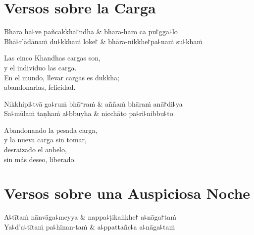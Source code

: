\chapter{Versos sobre la Carga}


\begin{leader}
\end{leader}

\begin{twochants}
Bhārā ha꜕ve pañcakkha꜓ndhā & bhāra-hāro ca pu꜓gga꜕lo \\
Bhā꜕r'ādānaṁ du꜕kkhaṁ loke꜓ & bhāra-nikkhe꜓pa꜕naṁ su꜕khaṁ \\
\end{twochants}

\begin{english}
  Las cinco Khandhas cargas son,\\
  y el individuo las carga.\\
  En el mundo, llevar cargas es dukkha;\\
  abandonarlas, felicidad.
\end{english}

\begin{twochants}
Nikkhipi꜕tvā ga꜕ruṁ bhā꜓raṁ & aññaṁ bhāraṁ anā꜓di꜕ya \\
Sa꜕mūlaṁ taṇhaṁ a꜕bbuyha & nicchāto pa꜕ri꜕nibbu꜕to \\
\end{twochants}

\begin{english}
  Abandonando la pesada carga,\\
  y la nueva carga sin tomar,\\
  desraizado el anhelo,\\
  sin más deseo, liberado.
\end{english}

\chapter{Versos sobre una Auspiciosa Noche}


\begin{leader}
\end{leader}

\begin{twochants}
  A꜕tītaṁ nānvāga꜕meyya & nappa꜕ṭikaṅkhe꜓ a꜕nāga꜓taṁ \\
  Ya꜕d'a꜕tītaṁ pa꜕hīnan-taṁ & a꜕ppattañc꜕a a꜕nāga꜕taṁ \\
\end{twochants}

